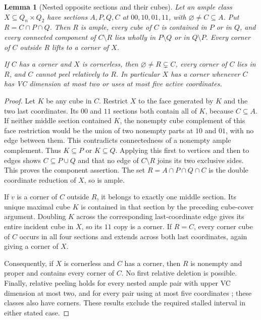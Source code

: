 \documentclass[11pt]{article}
\numberwithin{equation}{section}
\newtheorem{lemma}[theorem]{Lemma}
\theoremstyle{definition}
\theoremstyle{remark}
\begin{document}
\begin{lemma}[Nested opposite sections and their cubes]
\label{lem:nested-diagonal-cube-cover}
Let an ample class $X\subseteq Q_n\times Q_2$ have sections
$A,P,Q,C$ at $00,10,01,11$, with $\varnothing\ne C\subseteq A$.
Put $R=C\cap P\cap Q$. Then $R$ is ample, every cube of $C$ is
contained in $P$ or in $Q$, and every connected component of
$C\setminus R$ lies wholly in $P\setminus Q$ or in $Q\setminus P$.
Every corner of $C$ outside $R$ lifts to a corner of $X$.

If $C$ has a corner and $X$ is cornerless, then
$\varnothing\ne R\subsetneq C$, every corner of $C$ lies in $R$,
and $C$ cannot peel relatively to $R$. In particular $X$ has a corner
whenever $C$ has VC dimension at most two or uses at most five active
coordinates.
\end{lemma}
\begin{proof}
Let $K$ be any cube in $C$. Restrict $X$ to the face generated by $K$
and the two last coordinates. Its $00$ and $11$ sections both contain
all of $K$, because $C\subseteq A$. If neither middle section contained
$K$, the nonempty cube complement of this face restriction would be
the union of two nonempty parts at $10$ and $01$, with no edge between
them. This contradicts connectedness of a nonempty ample complement.
Thus $K\subseteq P$ or $K\subseteq Q$. Applying this first to vertices
and then to edges shows $C\subseteq P\cup Q$ and that no edge of
$C\setminus R$ joins its two exclusive sides. This proves the component
assertion. The set $R=A\cap P\cap Q\cap C$ is the double coordinate
reduction of $X$, so is ample.

If $v$ is a corner of $C$ outside $R$, it belongs to exactly one middle
section. Its unique maximal cube $K$ is contained in that section by
the preceding cube-cover argument. Doubling $K$ across the corresponding
last-coordinate edge gives its entire incident cube in $X$, so its
$11$ copy is a corner. If $R=C$, every corner cube of $C$ occurs in
all four sections and extends across both last coordinates, again
giving a corner of $X$.

Consequently, if $X$ is cornerless and $C$ has a corner, then $R$ is
nonempty and proper and contains every corner of $C$. No first relative
deletion is possible. Finally, relative peeling holds for every nested
ample pair with upper VC dimension at most two, and for every pair
using at most five coordinates \cite{BousquetDampReader}; these classes
also have corners. These results exclude the required stalled interval
in either stated case.
\end{proof}
\end{document}

